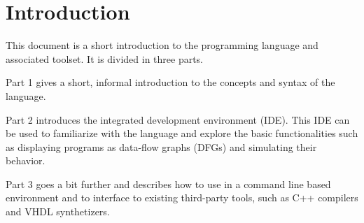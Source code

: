 
\chapter*{Introduction}
\label{sec:introduction}

This document is a short introduction to the \caph programming language and associated toolset. It
is divided in three parts.

\medskip Part 1 gives a short, informal introduction to the concepts and syntax of the language.

\medskip Part 2 introduces the \caph integrated development environment (IDE). This IDE can be used
to familiarize with the language and explore the basic functionalities such as displaying programs
as data-flow graphs (DFGs) and simulating their behavior.

\medskip Part 3 goes a bit further and describes how to use \caph in a command line based
environment and to interface to existing third-party tools, such as C++ compilers and
VHDL synthetizers.

